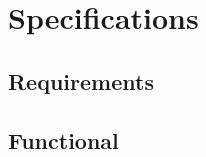 \documentclass{article}
\begin{document}
\section{Specifications}
\label{sec:specs}
\paragraph{}

\lipsum[1-2]

\subsection{Requirements}
\label{subsec:reqs}
\paragraph{}

\lipsum[1-2]

\subsection{Functional}
\label{subsec:func}
\paragraph{}

\lipsum[1-2]
\end{document}
